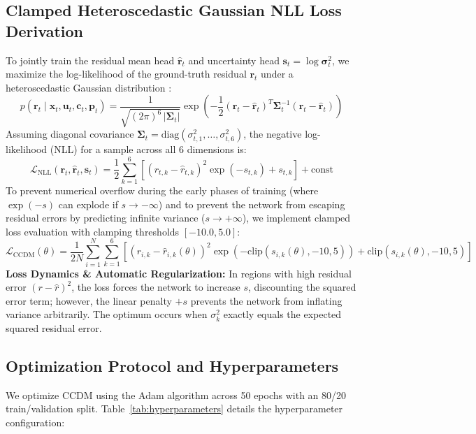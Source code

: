 \documentclass[10pt,a4paper]{article}
\begin{document}
\subsection{Clamped Heteroscedastic Gaussian NLL Loss Derivation}
To jointly train the residual mean head $\hat{\mathbf{r}}_t$ and uncertainty head $\mathbf{s}_t = \log \bm{\sigma}_t^2$, we maximize the log-likelihood of the ground-truth residual $\mathbf{r}_t$ under a heteroscedastic Gaussian distribution \cite{kendall2017what}:
\begin{equation}
p(\mathbf{r}_t \mid \mathbf{x}_t, \mathbf{u}_t, \mathbf{c}_t, \mathbf{p}_t) = \frac{1}{\sqrt{(2\pi)^6 \, |\bm{\Sigma}_t|}} \exp\left(-\frac{1}{2} (\mathbf{r}_t - \hat{\mathbf{r}}_t)^T \bm{\Sigma}_t^{-1} (\mathbf{r}_t - \hat{\mathbf{r}}_t)\right)
\label{eq:gaussian_likelihood}
\end{equation}
Assuming diagonal covariance $\bm{\Sigma}_t = \mathrm{diag}(\sigma_{t,1}^2, \dots, \sigma_{t,6}^2)$, the negative log-likelihood (NLL) for a sample across all 6 dimensions is:
\begin{equation}
\mathcal{L}_{\mathrm{NLL}}(\mathbf{r}_t, \hat{\mathbf{r}}_t, \mathbf{s}_t) = \frac{1}{2} \sum_{k=1}^6 \left[ (r_{t,k} - \hat{r}_{t,k})^2 \exp(-s_{t,k}) + s_{t,k} \right] + \mathrm{const}
\label{eq:nll_loss}
\end{equation}
To prevent numerical overflow during the early phases of training (where $\exp(-s)$ can explode if $s \rightarrow -\infty$) and to prevent the network from escaping residual errors by predicting infinite variance ($s \rightarrow +\infty$), we implement clamped loss evaluation with clamping thresholds $[-10.0, 5.0]$:
\begin{equation}
\mathcal{L}_{\mathrm{CCDM}}(\theta) = \frac{1}{2N} \sum_{i=1}^N \sum_{k=1}^6 \left[ \left(r_{i,k} - \hat{r}_{i,k}(\theta)\right)^2 \exp\left(-\mathrm{clip}(s_{i,k}(\theta), -10, 5)\right) + \mathrm{clip}(s_{i,k}(\theta), -10, 5) \right]
\label{eq:clamped_nll}
\end{equation}
\textbf{Loss Dynamics \& Automatic Regularization:} In regions with high residual error $(r - \hat{r})^2$, the loss forces the network to increase $s$, discounting the squared error term; however, the linear penalty $+s$ prevents the network from inflating variance arbitrarily. The optimum occurs when $\sigma_k^2$ exactly equals the expected squared residual error.

\subsection{Optimization Protocol and Hyperparameters}
We optimize CCDM using the Adam algorithm \cite{kingma2015adam} across 50 epochs with an 80/20 train/validation split. Table~\ref{tab:hyperparameters} details the hyperparameter configuration:
\end{document}
